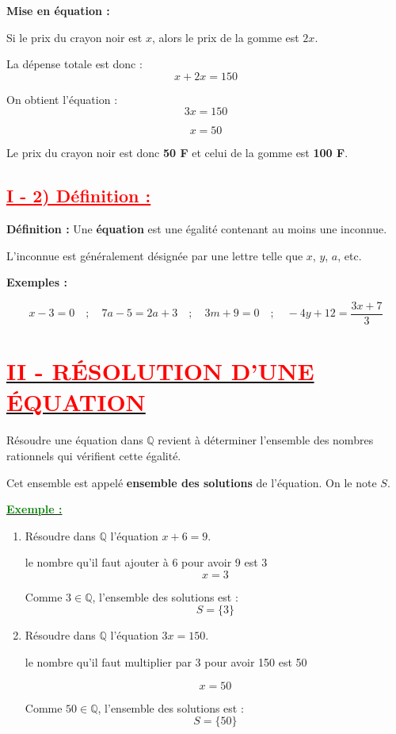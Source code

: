 \documentclass[12pt,a4paper]{article}
\newcounter{exemple} %
\newcommand{\exemple}{%
  \refstepcounter{exemple}%
  \textbf{\textcolor{green}{Exemple \theexemple :}} \ignorespaces
}
\begin{document}
\vspace{0.5cm}

\textbf{Mise en équation :}

Si le prix du crayon noir est $x$, alors le prix de la gomme est $2x$.

La dépense totale est donc :
\[
x + 2x = 150
\]

On obtient l’équation :
\[
3x = 150
\]

\[
x = 50
\]

Le prix du crayon noir est donc \textbf{50 F} et celui de la gomme est \textbf{100 F}.

\vspace{0.5cm}

\subsection*{\textcolor{red}{\underline{I - 2) Définition :}}}

\textbf{Définition :}  
Une \textbf{équation} est une égalité contenant au moins une inconnue.  

L’inconnue est généralement désignée par une lettre telle que $x$, $y$, $a$, etc.

\vspace{0.3cm}

\textbf{Exemples :}

\[
x - 3 = 0 \quad ; \quad 7a - 5 = 2a + 3 \quad ; \quad 3m + 9 = 0 \quad ; \quad -4y + 12 = \frac{3x + 7}{3}
\]

\vspace{0.5cm}

\section*{\underline{\textcolor{red}{II - RÉSOLUTION D’UNE ÉQUATION}}}

Résoudre une équation dans $\mathbb{Q}$ revient à déterminer l’ensemble des nombres rationnels qui vérifient cette égalité.  

Cet ensemble est appelé \textbf{ensemble des solutions} de l’équation.  
On le note $S$.

\vspace{0.4cm}

\underline{\exemple}

\begin{enumerate}
\item Résoudre dans $\mathbb{Q}$ l’équation $x + 6 = 9$.

le nombre qu'il faut ajouter à 6 pour avoir 9 est 3
\[
x = 3
\]

Comme $3 \in \mathbb{Q}$, l’ensemble des solutions est :
\[
S = \{3\}
\]

\vspace{0.5cm}

\item Résoudre dans $\mathbb{Q}$ l’équation $3x = 150$.

le nombre qu'il faut multiplier par 3 pour avoir 150 est 50

\[
x = 50
\]

Comme $50 \in \mathbb{Q}$, l’ensemble des solutions est :
\[
S = \{50\}
\]
\end{enumerate}
\end{document}
